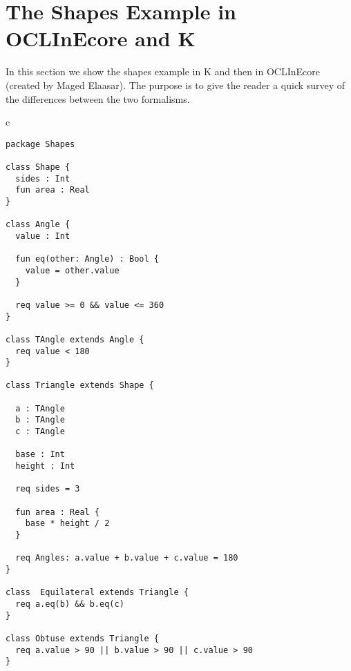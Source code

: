 
\section{The Shapes Example in OCLInEcore and K}
\label{sec:shapessidebyside}

In this section we show the shapes example in K and then in OCLInEcore (created by Maged Elaasar). The purpose is to give the
reader a quick survey of the differences between the two formalisms.

\lstset{language=K,numbers=none}

\begin{center}
\begin{tabular}{c}
\small
\begin{lstlisting}
package Shapes

class Shape {
  sides : Int
  fun area : Real
}

class Angle {
  value : Int

  fun eq(other: Angle) : Bool {
    value = other.value
  }

  req value >= 0 && value <= 360
}

class TAngle extends Angle {
  req value < 180
}

class Triangle extends Shape {

  a : TAngle
  b : TAngle
  c : TAngle

  base : Int
  height : Int
  
  req sides = 3

  fun area : Real {
    base * height / 2  
  }
  
  req Angles: a.value + b.value + c.value = 180
}

class  Equilateral extends Triangle {
  req a.eq(b) && b.eq(c) 
}

class Obtuse extends Triangle {
  req a.value > 90 || b.value > 90 || c.value > 90
}
\end{lstlisting}
\end{tabular}
\end{center}


\lstset{language=K,numbers=none}

